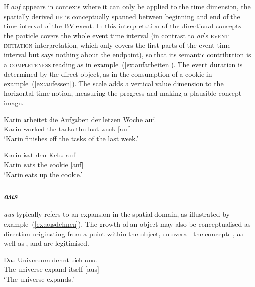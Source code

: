 \documentclass[output=paper]{langsci/langscibook}
\begin{document}
If \textit{auf} appears in contexts where it can only be applied to
the time dimension, the spatially derived \textsc{up} is conceptually
spanned between beginning and end of the time interval of the BV
event. In this interpretation of the directional concepts the particle
covers the whole event time interval (in contrast to \textit{an}'s
\textsc{event initiation} interpretation, which only covers the first
parts of the event time interval but says nothing about the endpoint),
so that its semantic contribution is a \textsc{completeness} reading
as in example~(\ref{ex:aufarbeiten}). The event duration is determined
by the direct object, as in the consumption of a cookie in
example~(\ref{ex:aufessen}). The scale adds a vertical value dimension
to the horizontal time notion, measuring the progress and making
 a plausible concept image.

\ea\label{ex:aufarbeiten}
\gll Karin arbeitet die Aufgaben der letzen Woche auf.\\
Karin worked the tasks the last week [auf]\\
\glt `Karin finishes off the tasks of the last week.'
\z

\ea\label{ex:aufessen}
\gll Karin isst den Keks auf.\\
Karin eats the cookie [auf]\\
\glt `Karin eats up the cookie.'
\z



\subsubsection{\textit{aus}}

\textit{aus} typically refers to an expansion in the spatial domain,
as illustrated by example~(\ref{ex:ausdehnen}). The growth of an
object may also be conceptualised as direction originating from a
point within the object, so overall the concepts ,
 as well as ,
 and  are legitimised.

\ea\label{ex:ausdehnen}
\gll Das Universum dehnt sich aus.\\
The universe expand itself [aus]\\
\glt `The universe expands.'
\z
\end{document}
